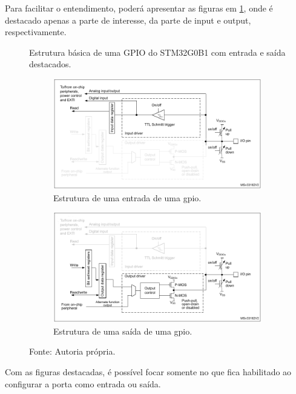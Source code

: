 \documentclass[12pt,a4paper]{report}
\begin{document}
Para facilitar o entendimento, poderá apresentar as figuras em \ref{fig:basic_gpio_structure_faded}, onde é destacado apenas a parte de interesse, da parte de input e output, respectivamente.

\begin{figure}[H]
    \centering
    \caption{Estrutura básica de uma GPIO do STM32G0B1 com entrada e saída destacados.}
    \begin{subfigure}{0.4\textwidth}
        \centering
        \caption{Estrutura de uma entrada de uma gpio.}
        \includegraphics[width=1\linewidth]{fig/basic_gpio_structure_in.png}
    \end{subfigure}
    \begin{subfigure}{0.4\textwidth}
        \centering
        \caption{Estrutura de uma saída de uma gpio.}
        \includegraphics[width=1\linewidth]{fig/basic_gpio_structure_out.png}
    \end{subfigure}
    \caption*{Fonte: Autoria própria.}
    \label{fig:basic_gpio_structure_faded}
\end{figure}

Com as figuras destacadas, é possível focar somente no que fica habilitado ao configurar a porta como entrada ou saída.
\end{document}
